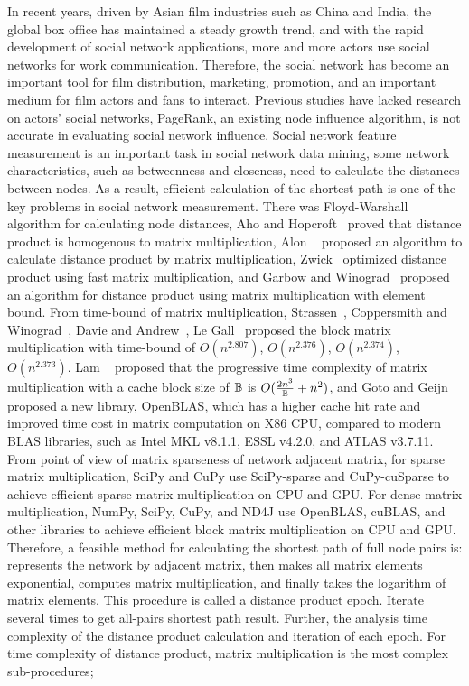 \documentclass[review]{cvpr}
\begin{document}
In recent years, driven by Asian film industries such as China and India, the global box office has maintained a steady growth trend, and with the rapid development of social network applications, more and more actors use social networks for work communication.
Therefore, the social network has become an important tool for film distribution, marketing, promotion, and an important medium for film actors and fans to interact.
Previous studies have lacked research on actors' social networks, PageRank, an existing node influence algorithm, is not accurate in evaluating social network influence.
Social network feature measurement is an important task in social network data mining, some network characteristics, such as betweenness and closeness, need to calculate the distances between nodes.
As a result, efficient calculation of the shortest path is one of the key problems in social network measurement.
There was Floyd-Warshall~\cite{floyd1962algorithm,warshall1962theorem} algorithm for calculating node distances, Aho and Hopcroft~\cite{aho1974design} proved that distance product is homogenous to matrix multiplication,
Alon \etal~\cite{alon1997exponent} proposed an algorithm to calculate distance product by matrix multiplication, Zwick~\cite{zwick2002all} optimized distance product using fast matrix multiplication,
and Garbow and Winograd~\cite{garbow1985scaling} proposed an algorithm for distance product using matrix multiplication with element bound.
From time-bound of matrix multiplication, Strassen~\cite{strassen1969gaussian}, Coppersmith and Winograd~\cite{coppersmith1987matrix}, Davie and Andrew~\cite{davie2013improved}, Le Gall~\cite{le2014powers} proposed the block matrix multiplication with time-bound of \(O(n ^ {2.807})\), \(O(n^{2.376})\), \(O(n^{2.374})\), \(O(n^{2.373})\).
Lam \etal~\cite{lam1991cache} proposed that the progressive time complexity of matrix multiplication with a cache block size of $\Bbb B$ is \(O({2n^3 \over \Bbb B}+{n^2})\),
and Goto and Geijn~\cite{goto2008anatomy} proposed a new library, OpenBLAS, which has a higher cache hit rate and improved time cost in matrix computation on X86 CPU, compared to modern BLAS libraries, such as Intel MKL v8.1.1, ESSL v4.2.0, and ATLAS v3.7.11.
From point of view of matrix sparseness of network adjacent matrix, for sparse matrix multiplication, SciPy and CuPy use SciPy-sparse and CuPy-cuSparse to achieve efficient sparse matrix multiplication on CPU and GPU.
For dense matrix multiplication, NumPy, SciPy, CuPy, and ND4J use OpenBLAS, cuBLAS, and other libraries to achieve efficient block matrix multiplication on CPU and GPU.
Therefore, a feasible method for calculating the shortest path of full node pairs is: represents the network by adjacent matrix, then makes all matrix elements exponential, computes matrix multiplication, and finally takes the logarithm of matrix elements.
This procedure is called a distance product epoch.
Iterate several times to get all-pairs shortest path result.
Further, the analysis time complexity of the distance product calculation and iteration of each epoch.
For time complexity of distance product, matrix multiplication is the most complex sub-procedures;
\end{document}
